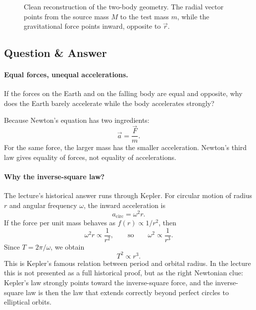 \begin{figure}
\centering
{}
\caption{Clean reconstruction of the two-body geometry. The radial vector points from the source mass \(M\) to the test mass \(m\), while the gravitational force points inward, opposite to \(\vec r\).}
\end{figure}

\subsection{Question \& Answer}

\paragraph{Equal forces, unequal accelerations.}
If the forces on the Earth and on the falling body are equal and opposite, why does the Earth barely accelerate while the body accelerates strongly?

Because Newton's equation has two ingredients:
\[
\vec a = \frac{\vec F}{m}.
\]
For the same force, the larger mass has the smaller acceleration. Newton's third law gives equality of forces, not equality of accelerations.

\paragraph{Why the inverse-square law?}
The lecture's historical answer runs through Kepler. For circular motion of radius \(r\) and angular frequency \(\omega\), the inward acceleration is
\begin{equation}
a_{\mathrm{circ}}=\omega^2 r.
\end{equation}
If the force per unit mass behaves as \(f(r)\propto 1/r^2\), then
\begin{equation}
\omega^2 r \propto \frac{1}{r^2},
\qquad\text{so}\qquad
\omega^2\propto \frac{1}{r^3}.
\end{equation}
Since \(T=2\pi/\omega\), we obtain
\begin{equation}
T^2\propto r^3.
\end{equation}
This is Kepler's famous relation between period and orbital radius. In the lecture this is not presented as a full historical proof, but as the right Newtonian clue: Kepler's law strongly points toward the inverse-square force, and the inverse-square law is then the law that extends correctly beyond perfect circles to elliptical orbits.

